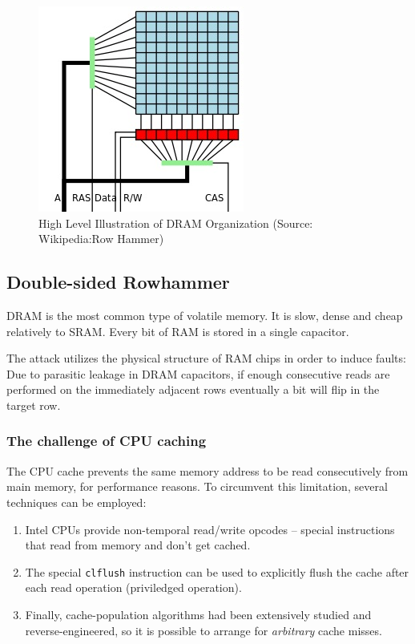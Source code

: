 \begin{figure}[h!]
    \centering
    \includegraphics[width=0.5\linewidth]{images/ch9/DRAM.jpg}
    \caption{High Level Illustration of DRAM Organization (Source: Wikipedia:Row Hammer)}
    \label{fig:dram_svg}
\end{figure}

\subsection{Double-sided Rowhammer}
DRAM is the most common type of volatile memory. It is slow, dense and cheap relatively to SRAM. Every bit of RAM is stored in a single capacitor.

The attack \cite{bib:rowhammer} utilizes the physical structure of RAM chips in order to induce faults: Due to parasitic leakage in DRAM capacitors, if enough consecutive reads are performed on the immediately adjacent rows eventually a bit will flip in the target row.

\subsubsection{The challenge of CPU caching}
The CPU cache prevents the same memory address to be read consecutively from main memory, for performance reasons.
To circumvent this limitation, several techniques can be employed:
\begin{enumerate}
    \item Intel CPUs provide non-temporal read/write opcodes -- special instructions that read from memory and don't get cached.
    \item The special \texttt{clflush} instruction can be used to explicitly flush the cache after each read operation (priviledged operation).
    \item Finally, cache-population algorithms had been extensively studied and reverse-engineered, so it is possible to arrange for \emph{arbitrary} cache misses.
\end{enumerate}

